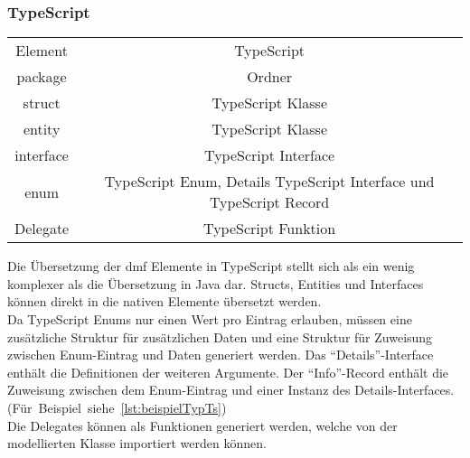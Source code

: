 \documentclass[./einleitung.tex]{subfiles}
\begin{document}
    \subsubsection{TypeScript}
    \begin{center}
        \begin{tabular}{| c || c |}
            \hline
            Element   & TypeScript           \\
            \hhline{|=||=|}
            package   & Ordner               \\
            \hline
            struct    & TypeScript Klasse    \\
            \hline
            entity    & TypeScript Klasse    \\
            \hline
            interface & TypeScript Interface \\
            \hline
            enum      & TypeScript Enum, Details TypeScript Interface und TypeScript Record   \\
            \hline
            Delegate  & TypeScript Funktion    \\
            \hline
        \end{tabular}
    \end{center}
    Die Übersetzung der \acrshort{dmf} Elemente in TypeScript stellt sich als ein wenig komplexer als die Übersetzung in Java dar.
    Structs, Entities und Interfaces können direkt in die nativen Elemente übersetzt werden.\\
    Da TypeScript Enums nur einen Wert pro Eintrag erlauben, müssen eine zusätzliche Struktur für zusätzlichen Daten und eine Struktur für Zuweisung zwischen Enum-Eintrag und Daten generiert werden.
    Das ``Details''-Interface enthält die Definitionen der weiteren Argumente.
    Der ``Info''-Record enthält die Zuweisung zwischen dem Enum-Eintrag und einer Instanz des Details-Interfaces. (Für~Beispiel~siehe~\ref{lst:beispielTypTs})\\
    Die Delegates können als Funktionen generiert werden, welche von der modellierten Klasse importiert werden können.
\end{document}
